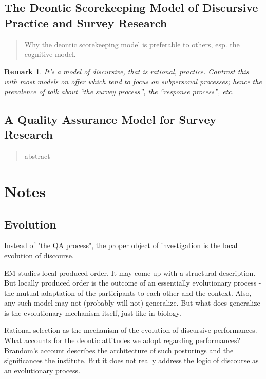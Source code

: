 \documentclass[11pt,twoside]{article}
\newtheorem{remark}{Remark}
\newcommand{\SR}{Survey Research}
\begin{document}
\subsection{The Deontic Scorekeeping Model of Discursive Practice and \SR{}}

\begin{abstract}
Why the deontic scorekeeping model is preferable to others, esp. the
cognitive model.
\end{abstract}

\begin{remark}
  It's a model of discursive, that is rational, practice.  Contrast
  this with most models on offer which tend to focus on subpersonal
  processes; hence the prevalence of talk about ``the survey
  process'', the ``response process'', etc.
\end{remark}

\subsection{A Quality Assurance Model for \SR{}}

\begin{abstract}
abstract
\end{abstract}

\section{Notes}

\subsection{Evolution}

Instead of "the QA process", the proper object of investigation is the
local evolution of discourse.

EM studies local produced order.  It may come up with a structural
description.  But locally produced order is the outcome of an
essentially evolutionary process - the mutual adaptation of the
participants to each other and the context.  Also, any such model may
not (probably will not) generalize.  But what does generalize is the
evolutionary mechanism itself, just like in biology.

Rational selection as the mechanism of the evolution of discursive
performances.  What accounts for the deontic attitudes we adopt
regarding performances?  Brandom's account describes the architecture
of such posturings and the significances the institute.  But it does
not really address the logic of discourse as an evolutionary process.
\end{document}

